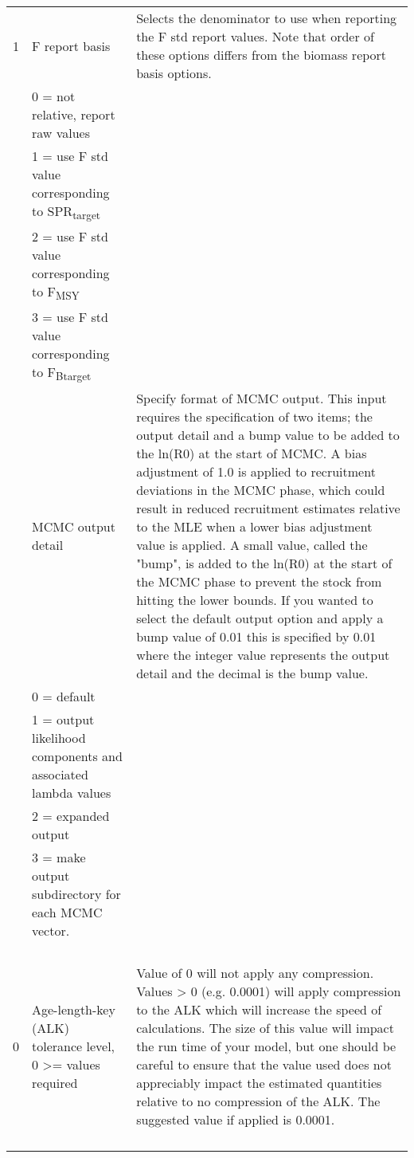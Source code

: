 \begin{landscape}
\begin{longtable}{p{1.5cm} p{7cm} p{12.5cm}}
 \hline
 1 & F report basis &  \multirow{1}{1cm}[-0.1cm]{\parbox{12.5cm}{Selects the denominator to use when reporting the F std report values.  Note that order of these options differs from the biomass report basis options.}}\\
   & 0 = not relative, report raw values & \\
   & 1 = use F std value corresponding to SPR\textsubscript{target} & \\
   & 2 = use F std value corresponding to F\textsubscript{MSY} & \\
   & 3 = use F std value corresponding to F\textsubscript{Btarget} & \\

  \pagebreak
  0.01 & MCMC output detail & \multirow{1}{1cm}[-0.1cm]{\parbox{12.5cm}{Specify format of MCMC output. This input requires the specification of two items; the output detail and a bump value to be added to the ln(R0) at the start of MCMC. A bias adjustment of 1.0 is applied to recruitment deviations in the MCMC phase, which could result in reduced recruitment estimates relative to the MLE when a lower bias adjustment value is applied.  A small value, called the "bump", is added to the ln(R0) at the start of the MCMC phase to prevent the stock from hitting the lower bounds. If you wanted to select the default output option and apply a bump value of 0.01 this is specified by 0.01 where the integer value represents the output detail and the decimal is the bump value.}} \\
  & 0 = default & \\
  & 1 = output likelihood components and associated lambda values &  \\
  & 2 = expanded output &  \\		 
  & 3 = make output subdirectory for each MCMC vector. &  \\
  & & \\
  & & \\
  & & \\
  & & \\		 
  
  \hline
  \hypertarget{ALK}{0} & Age-length-key (ALK) tolerance level, 0 >= values required & \multirow{1}{1cm}[-0.1cm]{\parbox{12.5cm}{Value of 0 will not apply any compression.  Values > 0 (e.g. 0.0001) will apply compression to the ALK which will increase the speed of calculations.  The size of this value will impact the run time of your model, but one should be careful to ensure that the value used does not appreciably impact the estimated quantities relative to no compression of the ALK.  The suggested value if applied is 0.0001.}} \\  
  & & \\
  & & \\
  & & \\
  & & \\
 

\end{longtable}
\end{landscape}
